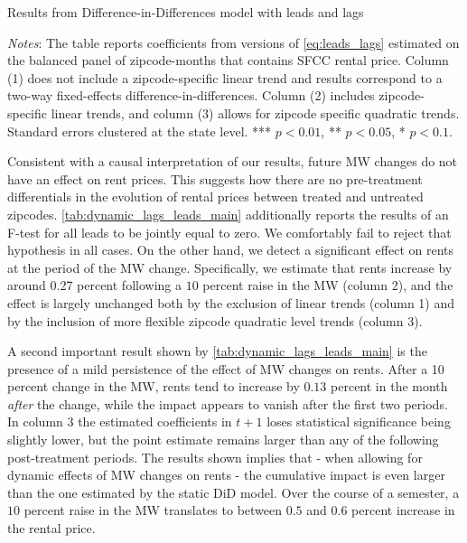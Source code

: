 \begin{table}[h!]
    \caption{Results from Difference-in-Differences model with leads and lags}
    \label{tab:dynamic_lags_leads_main}
    \centering
    
    \begin{minipage}{0.95\textwidth} \footnotesize
		\vspace{3mm} 
		\textit{Notes}: The table reports coefficients from versions of \autoref{eq:leads_lags} 
		estimated on the balanced panel of zipcode-months that contains SFCC rental price. Column 
		(1) does not include a zipcode-specific linear trend and results correspond to a two-way 
		fixed-effects difference-in-differences. Column (2) includes zipcode-specific linear trends, 
		and column (3) allows for zipcode specific quadratic trends. Standard errors clustered at 
		the state level. *** $p < 0.01$, ** $p < 0.05$, * $p < 0.1$.
	\end{minipage}
\end{table}

Consistent with a causal interpretation of our results, future MW changes do not have an effect on 
rent prices. This suggests how there are no pre-treatment differentials in the evolution of rental 
prices between treated and untreated zipcodes. \autoref{tab:dynamic_lags_leads_main} additionally 
reports the results of an F-test for all leads to be jointly equal to zero. We comfortably fail to 
reject that hypothesis in all cases. On the other hand, we detect a significant effect on rents at 
the period of the MW change. Specifically, we estimate that rents increase by around 0.27 percent 
following a $10$ percent raise in the MW (column 2), and the effect is largely unchanged both by the 
exclusion of linear trends (column 1) and by the inclusion of more flexible zipcode quadratic level 
trends (column 3).

A second important result shown by \autoref{tab:dynamic_lags_leads_main} is the presence of a mild 
persistence of the effect of MW changes on rents. After a 10 percent change in the MW, rents tend to 
increase by $0.13$ percent in the month \textit{after} the change, while the impact appears to vanish 
after the first two periods. In column 3 the estimated coefficients in $t+1$ loses statistical 
significance being slightly lower, but the point estimate remains larger than any of the following 
post-treatment periods. The results shown implies that - when allowing for dynamic effects of MW 
changes on rents - the cumulative impact is even larger than the one estimated by the static DiD 
model. Over the course of a semester, a $10$ percent raise in the MW translates to between $0.5$ 
and $0.6$ percent increase in the rental price.

